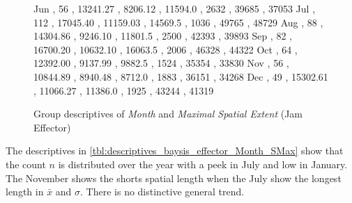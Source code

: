 \begin{figure}[ht!]
\begin{minipage}{0.55\textwidth}
{			Jun , 56  , 13241.27 , 8206.12  , 11594.0 , 2632 , 39685 , 37053 
			Jul , 112 , 17045.40 , 11159.03 , 14569.5 , 1036 , 49765 , 48729 
			Aug , 88  , 14304.86 , 9246.10  , 11801.5 , 2500 , 42393 , 39893 
			Sep , 82  , 16700.20 , 10632.10 , 16063.5 , 2006 , 46328 , 44322 
			Oct , 64  , 12392.00 , 9137.99  , 9882.5  , 1524 , 35354 , 33830 
			Nov , 56  , 10844.89 , 8940.48  , 8712.0  , 1883 , 36151 , 34268 
			Dec , 49  , 15302.61 , 11066.27 , 11386.0 , 1925 , 43244 , 41319 
		}\data
		\pgfplotstablesort[sort key=mean, sort cmp=float >]{\datasorted}{\data}
		\tiny
		\centering
		\label{fig:descriptives_baysis_effector_Month_SMax}
	\end{minipage}%
	\caption{Group descriptives of \textit{Month} and \textit{Maximal Spatial Extent} (Jam Effector)}
\end{figure}
The descriptives in \cref{tbl:descriptives_baysis_effector_Month_SMax} show that the count $n$ is distributed over the year with a peek in July and low in January. The November shows the shorts spatial length when the July show the longest length in $\bar{x}$ and $\sigma$. There is no distinctive general trend.

